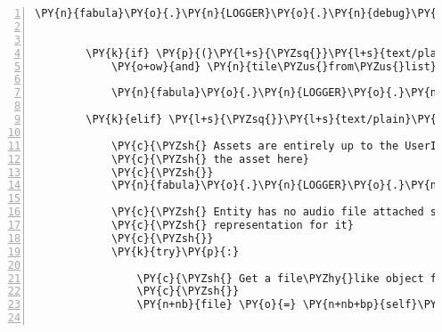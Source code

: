 \begin{Verbatim}[commandchars=\\\{\},numbers=left,firstnumber=1,stepnumber=1]
            \PY{n}{fabula}\PY{o}{.}\PY{n}{LOGGER}\PY{o}{.}\PY{n}{debug}\PY{p}{(}\PY{l+s}{\PYZdq{}}\PY{l+s}{changing sound for tile at \PYZob{}0\PYZcb{} to \PYZob{}1\PYZcb{}}\PY{l+s}{\PYZdq{}}\PY{o}{.}\PY{n}{format}\PY{p}{(}\PY{n+nb}{str}\PY{p}{(}\PY{n}{event}\PY{o}{.}\PY{n}{location}\PY{p}{)}\PY{p}{,}
                                                                               \PY{n}{tile\PYZus{}from\PYZus{}list}\PY{o}{.}\PY{n}{assets}\PY{p}{[}\PY{l+s}{\PYZsq{}}\PY{l+s}{audio/ogg}\PY{l+s}{\PYZsq{}}\PY{p}{]}\PY{o}{.}\PY{n}{data}\PY{p}{)}\PY{p}{)}

        \PY{k}{if} \PY{p}{(}\PY{l+s}{\PYZsq{}}\PY{l+s}{text/plain}\PY{l+s}{\PYZsq{}} \PY{o+ow}{in} \PY{n}{tile\PYZus{}from\PYZus{}list}\PY{o}{.}\PY{n}{assets}\PY{o}{.}\PY{n}{keys}\PY{p}{(}\PY{p}{)}
            \PY{o+ow}{and} \PY{n}{tile\PYZus{}from\PYZus{}list}\PY{o}{.}\PY{n}{assets}\PY{p}{[}\PY{l+s}{\PYZsq{}}\PY{l+s}{text/plain}\PY{l+s}{\PYZsq{}}\PY{p}{]}\PY{o}{.}\PY{n}{data} \PY{o+ow}{is} \PY{o+ow}{not} \PY{n+nb+bp}{None}\PY{p}{)}\PY{p}{:}

            \PY{n}{fabula}\PY{o}{.}\PY{n}{LOGGER}\PY{o}{.}\PY{n}{debug}\PY{p}{(}\PY{l+s}{\PYZdq{}}\PY{l+s}{tile already has an text asset: \PYZob{}\PYZcb{}}\PY{l+s}{\PYZdq{}}\PY{o}{.}\PY{n}{format}\PY{p}{(}\PY{n}{tile\PYZus{}from\PYZus{}list}\PY{p}{)}\PY{p}{)}

        \PY{k}{elif} \PY{l+s}{\PYZsq{}}\PY{l+s}{text/plain}\PY{l+s}{\PYZsq{}} \PY{o+ow}{in} \PY{n}{event}\PY{o}{.}\PY{n}{tile}\PY{o}{.}\PY{n}{assets}\PY{o}{.}\PY{n}{keys}\PY{p}{(}\PY{p}{)}\PY{p}{:}

            \PY{c}{\PYZsh{} Assets are entirely up to the UserInterface, so we fetch}
            \PY{c}{\PYZsh{} the asset here}
            \PY{c}{\PYZsh{}}
            \PY{n}{fabula}\PY{o}{.}\PY{n}{LOGGER}\PY{o}{.}\PY{n}{debug}\PY{p}{(}\PY{l+s}{\PYZdq{}}\PY{l+s}{no asset for \PYZob{}\PYZcb{}, attempting to fetch}\PY{l+s}{\PYZdq{}}\PY{o}{.}\PY{n}{format}\PY{p}{(}\PY{n}{tile\PYZus{}from\PYZus{}list}\PY{p}{)}\PY{p}{)}

            \PY{c}{\PYZsh{} Entity has no audio file attached so get a \PYZsq{}text/plain\PYZsq{}}
            \PY{c}{\PYZsh{} representation for it}
            \PY{c}{\PYZsh{}}
            \PY{k}{try}\PY{p}{:}

                \PY{c}{\PYZsh{} Get a file\PYZhy{}like object from asset manager}
                \PY{c}{\PYZsh{}}
                \PY{n+nb}{file} \PY{o}{=} \PY{n+nb+bp}{self}\PY{o}{.}\PY{n}{assets}\PY{o}{.}\PY{n}{fetch}\PY{p}{(}\PY{n}{tile\PYZus{}from\PYZus{}list}\PY{o}{.}\PY{n}{assets}\PY{p}{[}\PY{l+s}{\PYZsq{}}\PY{l+s}{text/plain}\PY{l+s}{\PYZsq{}}\PY{p}{]}\PY{o}{.}\PY{n}{uri}\PY{p}{,} \PY{n}{mode}\PY{o}{=}\PY{l+s}{\PYZsq{}}\PY{l+s}{t}\PY{l+s}{\PYZsq{}}\PY{p}{)}


\end{Verbatim}
